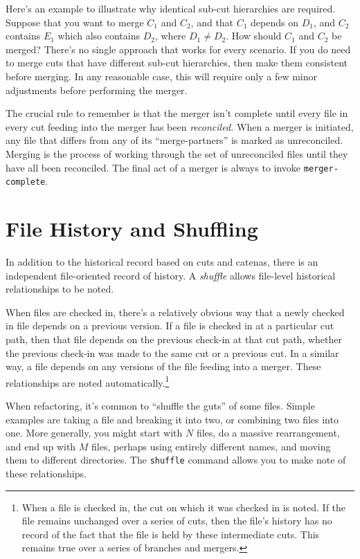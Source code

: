 \documentclass[10pt]{article}
\begin{document}
Here's an example to illustrate why identical sub-cut hierarchies are
required. Suppose that you want to merge $C_1$ and $C_2$, and that
$C_1$ depends on $D_1$, and $C_2$ contains $E_1$ which also contains
$D_2$, where $D_1\neq D_2$. How should $C_1$ and $C_2$ be merged?
There's no single approach that works for every scenario. If you do
need to merge cuts that have different sub-cut hierarchies, then make
them consistent before merging. In any reasonable case, this
will require only a few minor adjustments before performing the
merger. 

The crucial rule to remember is that the merger isn't complete until
every file in every cut feeding into the merger has been {\it
  reconciled.} When a merger is initiated, any file that differs from
any of its ``merge-partners'' is marked as unreconciled. Merging is
the process of working through the set of unreconciled files until
they have all been reconciled. The final act of a merger is always
to invoke {\tt merger-complete}.

\section{File History and Shuffling}

In addition to the historical record based on cuts and catenas, there
is an independent file-oriented record of history. A {\it shuffle}
allows file-level historical relationships to be noted. 

When files are checked in, there's a relatively obvious way that a
newly checked in file depends on a previous version. If a file is
checked in at a particular cut path, then that file depends on the
previous check-in at that cut path, whether the previous check-in was
made to the same cut or a previous cut. In a similar way, a file
depends on any versions of the file feeding into a merger. These
relationships are noted automatically.\footnote{When a file is checked
  in, the cut on which it was checked in is noted. If the file remains
  unchanged over a series of cuts, then the file's history has no
  record of the fact that the file is held by these intermediate
  cuts. This remains true over a series of branches and mergers.}

When refactoring, it's common to ``shuffle the guts'' of some
files. Simple examples are taking a file and breaking it into two, or
combining two files into one. More generally, you might start 
with $N$ files, do a massive rearrangement, and end up with $M$ files,
perhaps using entirely different names, and moving them to different
directories. The {\tt shuffle} command allows you to make note of these
relationships.
\end{document}
